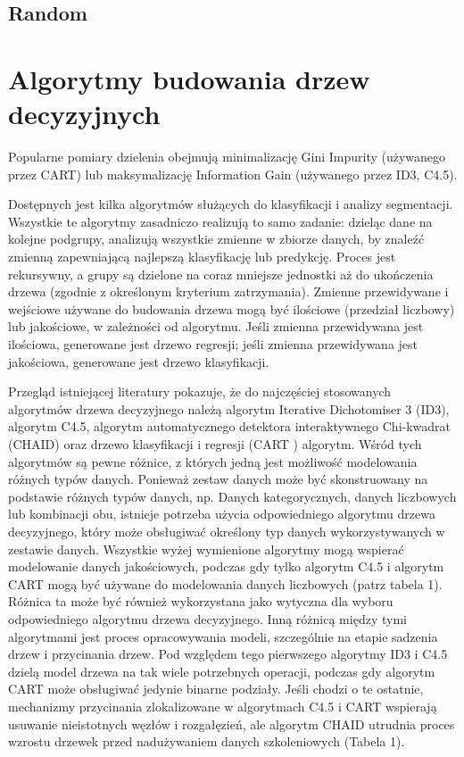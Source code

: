 \documentclass[10pt,a4paper]{article}
\begin{document}
\subsection{Random}


\section{Algorytmy budowania drzew decyzyjnych}
Popularne pomiary dzielenia obejmują minimalizację Gini Impurity (używanego przez CART) lub maksymalizację Information Gain (używanego przez ID3, C4.5).

Dostępnych jest kilka algorytmów służących do klasyfikacji i analizy segmentacji. Wszystkie te algorytmy zasadniczo realizują to samo zadanie: dzieląc dane na kolejne podgrupy, analizują wszystkie zmienne w zbiorze danych, by znaleźć zmienną zapewniającą najlepszą klasyfikację lub predykcję. Proces jest rekursywny, a grupy są dzielone na coraz mniejsze jednostki aż do ukończenia drzewa (zgodnie z określonym kryterium zatrzymania). Zmienne przewidywane i wejściowe używane do budowania drzewa mogą być ilościowe (przedział liczbowy) lub jakościowe, w zależności od algorytmu. Jeśli zmienna przewidywana jest ilościowa, generowane jest drzewo regresji; jeśli zmienna przewidywana jest jakościowa, generowane jest drzewo klasyfikacji.


Przegląd istniejącej literatury pokazuje, że do najczęściej stosowanych algorytmów drzewa decyzyjnego należą algorytm Iterative Dichotomiser 3 (ID3), algorytm C4.5, algorytm automatycznego detektora interaktywnego Chi-kwadrat (CHAID) oraz drzewo klasyfikacji i regresji (CART ) algorytm. Wśród tych algorytmów są pewne różnice, z których jedną jest możliwość modelowania różnych typów danych. Ponieważ zestaw danych może być skonstruowany na podstawie różnych typów danych, np. Danych kategorycznych, danych liczbowych lub kombinacji obu, istnieje potrzeba użycia odpowiedniego algorytmu drzewa decyzyjnego, który może obsługiwać określony typ danych wykorzystywanych w zestawie danych. Wszystkie wyżej wymienione algorytmy mogą wspierać modelowanie danych jakościowych, podczas gdy tylko algorytm C4.5 i algorytm CART mogą być używane do modelowania danych liczbowych (patrz tabela 1). Różnica ta może być również wykorzystana jako wytyczna dla wyboru odpowiedniego algorytmu drzewa decyzyjnego. Inną różnicą między tymi algorytmami jest proces opracowywania modeli, szczególnie na etapie sadzenia drzew i przycinania drzew. Pod względem tego pierwszego algorytmy ID3 i C4.5 dzielą model drzewa na tak wiele potrzebnych operacji, podczas gdy algorytm CART może obsługiwać jedynie binarne podziały. Jeśli chodzi o te ostatnie, mechanizmy przycinania zlokalizowane w algorytmach C4.5 i CART wspierają usuwanie nieistotnych węzłów i rozgałęzień, ale algorytm CHAID utrudnia proces wzrostu drzewek przed nadużywaniem danych szkoleniowych (Tabela 1).
\end{document}

